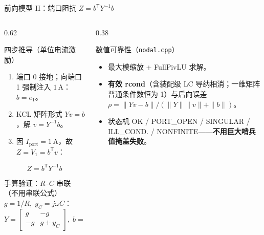 \documentclass[UTF8,aspectratio=169,10pt]{ctexbeamer}
\begin{document}
\begin{frame}{前向模型 II：端口阻抗 $Z=b^{\mathsf T}Y^{-1}b$}
  \begin{columns}
    \begin{column}{0.62\textwidth}
      \begin{block}{四步推导（单位电流激励）}
        \begin{enumerate}
          \item 端口 0 接地；向端口 1 强制注入 $1\,\mathrm{A}$：$b=e_1$。
          \item KCL 矩阵形式 $Yv=b$，解 $v=Y^{-1}b$。
          \item 因 $I_{\mathrm{port}}=1\,\mathrm{A}$，故 $Z=V_1=b^{\mathsf T}v$：
        \end{enumerate}
        \vspace{-1ex}
        \[
          \boxed{\,Z=b^{\mathsf T}Y^{-1}b\,}
        \]
      \end{block}
      \begin{exampleblock}{手算验证：$R$--$C$ 串联（不用串联公式）}
        {\small $g=1/R,\;y_C=j\omega C$：
        \[
          Y=\begin{bmatrix} g & -g\\ -g & g+y_C\end{bmatrix},\;
          b=\begin{bmatrix}1\\0\end{bmatrix}
          \Rightarrow
          Z=\frac{g+y_C}{g\,y_C}=R+\frac{1}{j\omega C}\;\checkmark
        \]}
      \end{exampleblock}
    \end{column}
    \begin{column}{0.38\textwidth}
      \begin{block}{数值可靠性（\texttt{nodal.cpp}）}
        \begin{itemize}
          \item 最大模缩放 + FullPivLU 求解。
          \item \textbf{有效 rcond}（含装配级 LC 导纳相消；一维矩阵普通条件数恒为 1）与后向误差
                $\rho=\|Yv-b\|/(\|Y\|\|v\|+\|b\|)$。
          \item 状态机 OK / PORT\_OPEN / SINGULAR / ILL\_COND. / NONFINITE——\textbf{不用巨大哨兵值掩盖失败}。
        \end{itemize}
      \end{block}
    \end{column}
  \end{columns}
\end{frame}
\end{document}
